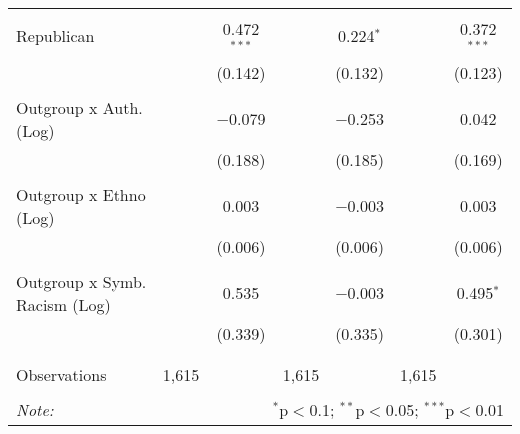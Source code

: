 \begin{table}[H]
{\begin{tabular}{@{\extracolsep{5pt}}lcccccc}
  & & & & & & \\ 
 Republican &  & 0.472$^{***}$ &  & 0.224$^{*}$ &  & 0.372$^{***}$ \\ 
  &  & (0.142) &  & (0.132) &  & (0.123) \\ 
  & & & & & & \\ 
 Outgroup x Auth. (Log) &  & $-$0.079 &  & $-$0.253 &  & 0.042 \\ 
  &  & (0.188) &  & (0.185) &  & (0.169) \\ 
  & & & & & & \\ 
 Outgroup x Ethno (Log) &  & 0.003 &  & $-$0.003 &  & 0.003 \\ 
  &  & (0.006) &  & (0.006) &  & (0.006) \\ 
  & & & & & & \\ 
 Outgroup x Symb. Racism (Log) &  & 0.535 &  & $-$0.003 &  & 0.495$^{*}$ \\ 
  &  & (0.339) &  & (0.335) &  & (0.301) \\ 
  & & & & & & \\ 
\hline \\[-1.8ex] 
Observations & 1,615 &  & 1,615 &  & 1,615 &  \\ 
\hline 
\hline \\[-1.8ex] 
\textit{Note:}  & \multicolumn{6}{r}{$^{*}$p$<$0.1; $^{**}$p$<$0.05; $^{***}$p$<$0.01} \\ 
\end{tabular}} 
\end{table} 
